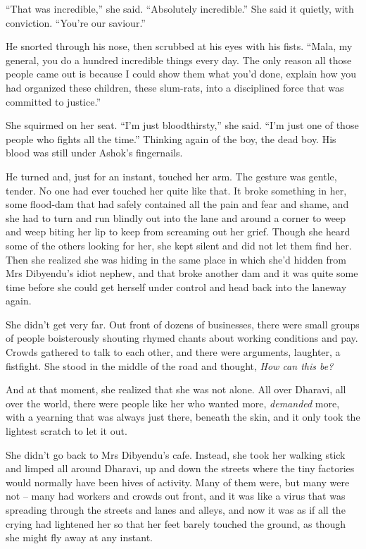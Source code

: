 ``That was incredible,'' she said. ``Absolutely incredible.'' She said
it quietly, with conviction. ``You're our saviour.''

He snorted through his nose, then scrubbed at his eyes with his
fists. ``Mala, my general, you do a hundred incredible things every
day. The only reason all those people came out is because I could
show them what you'd done, explain how you had organized these
children, these slum-rats, into a disciplined force that was
committed to justice.''

She squirmed on her seat. ``I'm just bloodthirsty,'' she said. ``I'm
just one of those people who fights all the time.'' Thinking again
of the boy, the dead boy. His blood was still under Ashok's
fingernails.

He turned and, just for an instant, touched her arm. The gesture
was gentle, tender. No one had ever touched her quite like that. It
broke something in her, some flood-dam that had safely contained
all the pain and fear and shame, and she had to turn and run
blindly out into the lane and around a corner to weep and weep
biting her lip to keep from screaming out her grief. Though she
heard some of the others looking for her, she kept silent and did
not let them find her. Then she realized she was hiding in the same
place in which she'd hidden from Mrs Dibyendu's idiot nephew, and
that broke another dam and it was quite some time before she could
get herself under control and head back into the laneway again.

She didn't get very far. Out front of dozens of businesses, there
were small groups of people boisterously shouting rhymed chants
about working conditions and pay. Crowds gathered to talk to each
other, and there were arguments, laughter, a fistfight. She stood
in the middle of the road and thought, \emph{How can this be?}

And at that moment, she realized that she was not alone. All over
Dharavi, all over the world, there were people like her who wanted
more, \emph{demanded} more, with a yearning that was always just
there, beneath the skin, and it only took the lightest scratch to
let it out.

She didn't go back to Mrs Dibyendu's cafe. Instead, she took her
walking stick and limped all around Dharavi, up and down the
streets where the tiny factories would normally have been hives of
activity. Many of them were, but many were not -- many had workers
and crowds out front, and it was like a virus that was spreading
through the streets and lanes and alleys, and now it was as if all
the crying had lightened her so that her feet barely touched the
ground, as though she might fly away at any instant.

